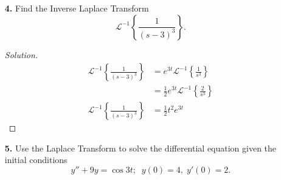 \documentclass[ 12pt ]{article}
\begin{document}
\begin{enumerate}
		\begin{proof}[Solution]\renewcommand{\qedsymbol}{}
			\begin{align*}
				\mathscr{L}\{t^{11}e^{-7t}\} &= \mathscr{L}\{t^{11}\}_{s \to s+7} \\
				&= \left [ \frac{11!}{s^{12}} \right ]_{s \to s+7} \\
				\mathscr{L}\{t^{11}e^{-7t}\} &= \frac{11!}{(s+7)^{12}}
			\end{align*}
		\end{proof}


	\item[\textbf{4.}] Find the Inverse Laplace Transform $$\mathscr{L}^{-1} \left \{ \frac{1}{(s-3)^3} \right \}.$$

		\begin{proof}[Solution]\renewcommand{\qedsymbol}{}
			\begin{align*}
				\mathscr{L}^{-1} \left \{ \frac{1}{(s-3)^3} \right \} &= e^{3t} \mathscr{L}^{-1} \left \{ \frac{1}{s^3} \right \} \\
				&= \frac{1}{2} e^{3t} \mathscr{L}^{-1} \left \{ \frac{2}{s^3} \right \} \\
				\mathscr{L}^{-1} \left \{ \frac{1}{(s-3)^3} \right \} &= \frac{1}{2} t^2 e^{3t}
			\end{align*}
		\end{proof}


	\item[\textbf{5.}] Use the Laplace Transform to solve the differential equation given the initial conditions $$y'' + 9y = \cos 3t;\;\; y(0) = 4,\; y'(0) = 2.$$


\end{enumerate}
\end{document}
